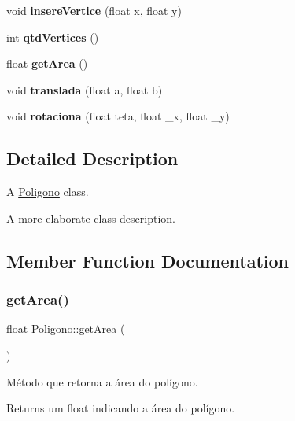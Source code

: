 \begin{DoxyCompactItemize}
\mbox{\label{classPoligono_aeaad76667207d96ea0d69c2dfb3bc2a9}} 
void {\bfseries insere\+Vertice} (float x, float y)
\item 
\mbox{\label{classPoligono_ae2c1c915b4a72104724d1302138e7caa}} 
int {\bfseries qtd\+Vertices} ()
\item 
\mbox{\label{classPoligono_ab1a85a090e7442bf3151602b05da9e19}} 
float {\bfseries get\+Area} ()
\item 
\mbox{\label{classPoligono_adbf605dfd0419b7301c9be0ec1dbe41b}} 
void {\bfseries translada} (float a, float b)
\item 
\mbox{\label{classPoligono_a93da79ac2b0cfd723c4c041f2fe1190c}} 
void {\bfseries rotaciona} (float teta, float \+\_\+x, float \+\_\+y)
\end{DoxyCompactItemize}


\subsection{Detailed Description}
A \mbox{\hyperlink{classPoligono}{Poligono}} class. 

A more elaborate class description. 

\subsection{Member Function Documentation}
\mbox{\label{classPoligono_ab1a85a090e7442bf3151602b05da9e19}} 
\subsubsection{\texorpdfstring{get\+Area()}{getArea()}}
{\footnotesize\ttfamily float Poligono\+::get\+Area (\begin{DoxyParamCaption}{ }\end{DoxyParamCaption})}



Método que retorna a área do polígono. 

\begin{DoxyReturn}{Returns}
um float indicando a área do polígono. 
\end{DoxyReturn}
\mbox{\label{classPoligono_aeaad76667207d96ea0d69c2dfb3bc2a9}} 
